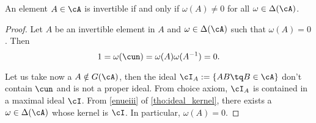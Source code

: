 



\begin{lemma}
An element $A\in\cA$ is invertible if and only if $\omega(A)\neq0$ for all $\omega\in\Delta(\cA)$.
\end{lemma}


\begin{proof}
Let $A$ be an invertible element in $A$ and $\omega\in\Delta(\cA)$ such that $\omega(A)=0$. Then 
\[
  1=\omega(\cun)=\omega(A)\omega(A^{-1})=0.
\]

Let us take now a $A\notin G(\cA)$, then the ideal $\cI_A:=\{AB\tq B\in\cA\}$ don't contain $\cun$ and is not a proper ideal. From choice axiom, $\cI_A$ is contained in a maximal ideal $\cI$. From \ref{enueiii} of \ref{tho:ideal_kernel}, there exists a $\omega\in\Delta(\cA)$ whose kernel is $\cI$. In particular, $\omega(A)=0$.
\end{proof}

